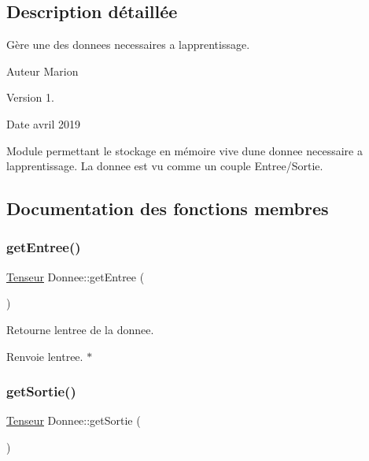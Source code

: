 \subsection{Description détaillée}
Gère une des donnees necessaires a l\textquotesingle{}apprentissage. 

\begin{DoxyAuthor}{Auteur}
Marion 
\end{DoxyAuthor}
\begin{DoxyVersion}{Version}
1. 
\end{DoxyVersion}
\begin{DoxyDate}{Date}
avril 2019
\end{DoxyDate}
Module permettant le stockage en mémoire vive d\textquotesingle{}une donnee necessaire a l\textquotesingle{}apprentissage. La donnee est vu comme un couple Entree/\+Sortie. 

\subsection{Documentation des fonctions membres}
\mbox{\label{classDonnee_af4b02bb80cd289073f1eb56fc9046c11}} 
\subsubsection{\texorpdfstring{get\+Entree()}{getEntree()}}
{\footnotesize\ttfamily \hyperlink{classTenseur}{Tenseur} Donnee\+::get\+Entree (\begin{DoxyParamCaption}{ }\end{DoxyParamCaption})}



Retourne l\textquotesingle{}entree de la donnee. 

\begin{DoxyReturn}{Renvoie}
l\textquotesingle{}entree. $\ast$ 
\end{DoxyReturn}
\mbox{\label{classDonnee_aadc9c0ab3f163fa6c0e57daa57023de0}} 
\subsubsection{\texorpdfstring{get\+Sortie()}{getSortie()}}
{\footnotesize\ttfamily \hyperlink{classTenseur}{Tenseur} Donnee\+::get\+Sortie (\begin{DoxyParamCaption}{ }\end{DoxyParamCaption})}



